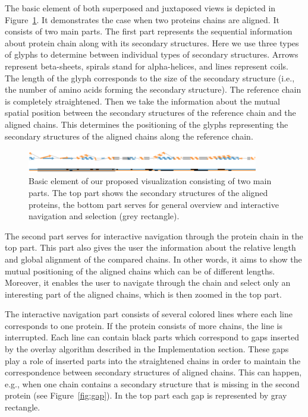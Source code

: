 \documentclass[twocolumn]{bmcart}%
\begin{document}
The basic element of both superposed and juxtaposed views is depicted in Figure~\ref{fig:element}.
It demonstrates the case when two proteins chains are aligned.
It consists of two main parts.
The first part represents the sequential information about protein chain along with its secondary structures.
Here we use three types of glyphs to determine between individual types of secondary structures.
Arrows represent beta-sheets, spirals stand for alpha-helices, and lines represent coils.
The length of the glyph corresponds to the size of the secondary structure (i.e., the number of amino acids forming the secondary structure).
The reference chain is completely straightened.
Then we take the information about the mutual spatial position between the secondary structures of the reference chain and the aligned chains.
This determines the positioning of the glyphs representing the secondary structures of the aligned chains along the reference chain.

\begin{figure}[t!]
  \centering
  \includegraphics[width=0.9\textwidth]{pics/element2.png}
  \caption{Basic element of our proposed visualization consisting of two main parts. The top part shows the secondary structures of the aligned proteins, the bottom part serves for general overview and interactive navigation and selection (grey rectangle).}
  \label{fig:element}
\end{figure}

The second part serves for interactive navigation through the protein chain in the top part. 
This part also gives the user the information about the relative length and global alignment of the compared chains.
In other words, it aims to show the mutual positioning of the aligned chains which can be of different lengths.
Moreover, it enables the user to navigate through the chain and select only an interesting part of the aligned chains, which is then zoomed in the top part.

The interactive navigation part consists of several colored lines where each line corresponds to one protein.
If the protein consists of more chains, the line is interrupted.
Each line can contain black parts which correspond to gaps inserted by the overlay algorithm described in the Implementation section.
These gaps play a role of inserted parts into the straightened chains in order to maintain the correspondence between secondary structures of aligned chains. 
This can happen, e.g., when one chain contains a secondary structure that is missing in the second protein (see Figure~\ref{fig:gap}).
In the top part each gap is represented by gray rectangle.
\end{document}
